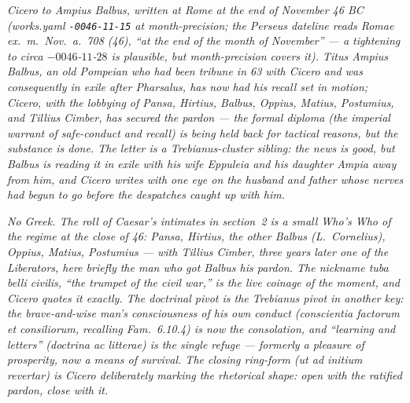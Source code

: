 
\textit{Cicero to Ampius Balbus, written at Rome at the end of
November 46 BC (works.yaml \texttt{-0046-11-15} at month-precision;
the Perseus dateline reads \textit{Romae ex.~m.~Nov.~a.~708 (46)},
``at the end of the month of November'' --- a tightening to
\textit{circa} ${-}0046$-$11$-$28$ is plausible, but
month-precision covers it). Titus Ampius Balbus, an old Pompeian
who had been tribune in 63 with Cicero and was consequently in
exile after Pharsalus, has now had his recall set in motion;
Cicero, with the lobbying of Pansa, Hirtius, Balbus, Oppius,
Matius, Postumius, and Tillius Cimber, has secured the pardon ---
the formal \textit{diploma} (the imperial warrant of safe-conduct
and recall) is being held back for tactical reasons, but the
substance is done. The letter is a Trebianus-cluster sibling: the
news is good, but Balbus is reading it in exile with his wife
Eppuleia and his daughter Ampia away from him, and Cicero writes
with one eye on the husband and father whose nerves had begun to
go before the despatches caught up with him.}

\textit{No Greek. The roll of Caesar's intimates in section~2 is
a small Who's Who of the regime at the close of 46: Pansa,
Hirtius, the other Balbus (L.~Cornelius), Oppius, Matius,
Postumius --- with Tillius Cimber, three years later one of the
Liberators, here briefly the man who got Balbus his pardon. The
nickname \textit{tuba belli civilis}, ``the trumpet of the civil
war,'' is the live coinage of the moment, and Cicero quotes it
exactly. The doctrinal pivot is the Trebianus pivot in another
key: the brave-and-wise man's consciousness of his own conduct
(\textit{conscientia factorum et consiliorum}, recalling
\textit{Fam.}~6.10.4) is now the consolation, and ``learning and
letters'' (\textit{doctrina ac litterae}) is the single refuge ---
formerly a pleasure of prosperity, now a means of survival. The
closing ring-form (\textit{ut ad initium revertar}) is Cicero
deliberately marking the rhetorical shape: open with the
ratified pardon, close with it.}
